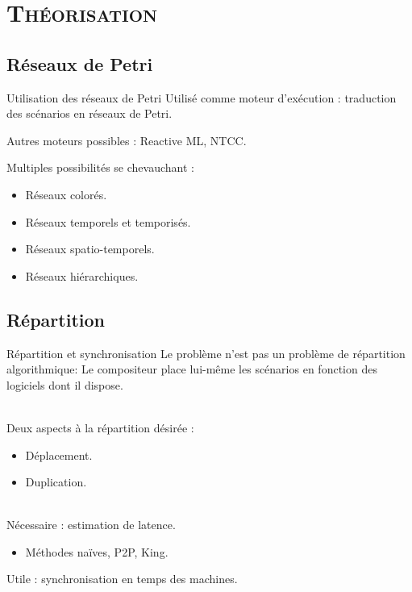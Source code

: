 
\section{\scshape Théorisation}
\subsection{Réseaux de Petri}
\begin{frame}{Utilisation des réseaux de Petri}
Utilisé comme moteur d'exécution : traduction des scénarios en réseaux de Petri\cite{allombert2009aspects}.

Autres moteurs possibles : Reactive ML\cite{arias2014modelling}, NTCC\cite{allombert2006concurrent}.

Multiples possibilités se chevauchant :
\begin{itemize}
	\item Réseaux colorés.
	\item Réseaux temporels et temporisés.
	\item Réseaux spatio-temporels.
	\item Réseaux hiérarchiques.
\end{itemize}

\end{frame}


\subsection{Répartition}
\begin{frame}{Répartition et synchronisation}
	Le problème n'est pas un problème de répartition algorithmique:
	Le compositeur place lui-même les scénarios en fonction des logiciels dont il dispose.
	
	~ \\
	Deux aspects à la répartition désirée : 
	\begin{itemize}
		\item Déplacement.
		\item Duplication. 
	\end{itemize}
	~ \\
	Nécessaire : estimation de latence.
	\begin{itemize}
		\item Méthodes naïves, P2P\cite{im2000method}, King\cite{gummadi2002king}.
	\end{itemize}
	
	Utile : synchronisation en temps des machines.
	\begin{itemize}
	\end{itemize}
\end{frame}
